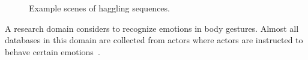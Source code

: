 

\begin{figure}
	\centering
	\caption{Example scenes of haggling sequences.} 
	\label{fig:haggling_others}
\end{figure}


A research domain considers to recognize emotions in body gestures. Almost all databases in this domain are collected from actors where actors are instructed to behave certain emotions~\cite{gunes2006bimodal, banziger2012introducing, de2004modeling}. 


